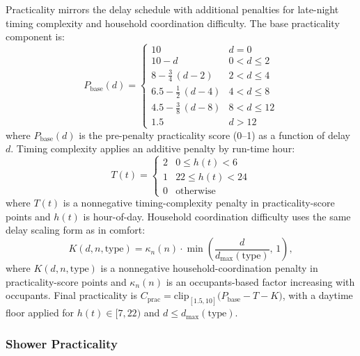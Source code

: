 \documentclass[final,3p,times]{elsarticle}
\begin{document}
Practicality mirrors the delay schedule with additional penalties for late-night timing complexity and household coordination difficulty.
The base practicality component is:
\begin{equation}
  P_{\mathrm{base}}(d)=
  \begin{cases}
    10                                  & d=0 \\[3pt]
    10-d                                & 0<d\le 2 \\[3pt]
    8-\frac{3}{4}\,(d-2)                & 2<d\le 4 \\[3pt]
    6.5-\frac{1}{2}\,(d-4)              & 4<d\le 8 \\[3pt]
    4.5-\frac{3}{8}\,(d-8)              & 8<d\le 12 \\[3pt]
    1.5                                 & d>12
  \end{cases}
  \label{eq:appliance_base_practicality}
\end{equation}
\noindent where $P_{\mathrm{base}}(d)$ is the pre-penalty practicality score (0--1) as a function of delay $d$.
Timing complexity applies an additive penalty by run-time hour:
\begin{equation}
  T(t)=
  \begin{cases}
    2 & 0\le h(t)<6 \\[3pt]
    1 & 22\le h(t)<24 \\[3pt]
    0 & \text{otherwise}
  \end{cases}
  \label{eq:appliance_timing_penalty}
\end{equation}
\noindent where $T(t)$ is a nonnegative timing-complexity penalty in practicality-score points and $h(t)$ is hour-of-day.
Household coordination difficulty uses the same delay scaling form as in comfort:
\begin{equation}
  K(d,n,\mathrm{type})=\kappa_n(n)\cdot \min\!\left(\frac{d}{d_{\max}(\mathrm{type})},\,1\right),
  \label{eq:appliance_coordination_penalty}
\end{equation}
\noindent where $K(d,n,\mathrm{type})$ is a nonnegative household-coordination penalty in practicality-score points and $\kappa_n(n)$ is an occupants-based factor increasing with occupants.
Final practicality is $C_{\mathrm{prac}}=\mathrm{clip}_{[1.5,10]}\!\bigl(P_{\mathrm{base}}-T-K\bigr)$, with a daytime floor applied for $h(t)\in[7,22)$ and $d\le d_{\max}(\mathrm{type})$.

\subsubsection{Shower Practicality}
\end{document}
